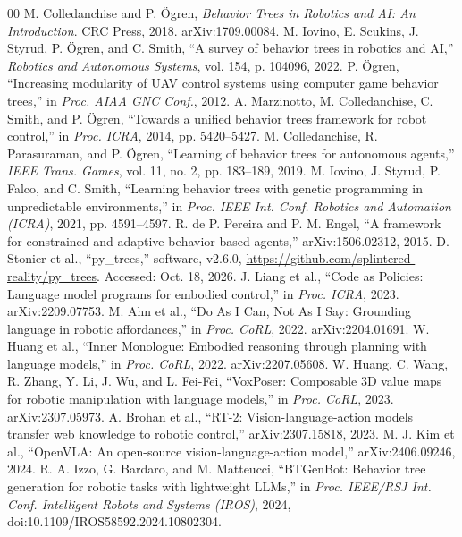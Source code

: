 \documentclass[conference]{IEEEtran}
\begin{document}
\begin{thebibliography}{00}
 M. Colledanchise and P. \"Ogren, \emph{Behavior Trees in Robotics and AI: An Introduction}. CRC Press, 2018. arXiv:1709.00084.
 M. Iovino, E. Scukins, J. Styrud, P. \"Ogren, and C. Smith, ``A survey of behavior trees in robotics and AI,'' \emph{Robotics and Autonomous Systems}, vol. 154, p. 104096, 2022.
 P. \"Ogren, ``Increasing modularity of UAV control systems using computer game behavior trees,'' in \emph{Proc. AIAA GNC Conf.}, 2012.
 A. Marzinotto, M. Colledanchise, C. Smith, and P. \"Ogren, ``Towards a unified behavior trees framework for robot control,'' in \emph{Proc. ICRA}, 2014, pp. 5420--5427.
 M. Colledanchise, R. Parasuraman, and P. \"Ogren, ``Learning of behavior trees for autonomous agents,'' \emph{IEEE Trans. Games}, vol. 11, no. 2, pp. 183--189, 2019.
 M. Iovino, J. Styrud, P. Falco, and C. Smith, ``Learning behavior trees with genetic programming in unpredictable environments,'' in \emph{Proc. IEEE Int. Conf. Robotics and Automation (ICRA)}, 2021, pp. 4591--4597.
 R. de P. Pereira and P. M. Engel, ``A framework for constrained and adaptive behavior-based agents,'' arXiv:1506.02312, 2015.
 D. Stonier et al., ``py\_trees,'' software, v2.6.0, \url{https://github.com/splintered-reality/py_trees}. Accessed: Oct. 18, 2026.
 J. Liang et al., ``Code as Policies: Language model programs for embodied control,'' in \emph{Proc. ICRA}, 2023. arXiv:2209.07753.
 M. Ahn et al., ``Do As I Can, Not As I Say: Grounding language in robotic affordances,'' in \emph{Proc. CoRL}, 2022. arXiv:2204.01691.
 W. Huang et al., ``Inner Monologue: Embodied reasoning through planning with language models,'' in \emph{Proc. CoRL}, 2022. arXiv:2207.05608.
 W. Huang, C. Wang, R. Zhang, Y. Li, J. Wu, and L. Fei-Fei, ``VoxPoser: Composable 3D value maps for robotic manipulation with language models,'' in \emph{Proc. CoRL}, 2023. arXiv:2307.05973.
 A. Brohan et al., ``RT-2: Vision-language-action models transfer web knowledge to robotic control,'' arXiv:2307.15818, 2023.
 M. J. Kim et al., ``OpenVLA: An open-source vision-language-action model,'' arXiv:2406.09246, 2024.
 R. A. Izzo, G. Bardaro, and M. Matteucci, ``BTGenBot: Behavior tree generation for robotic tasks with lightweight LLMs,'' in \emph{Proc. IEEE/RSJ Int. Conf. Intelligent Robots and Systems (IROS)}, 2024, doi:10.1109/IROS58592.2024.10802304.

\end{thebibliography}
\end{document}
